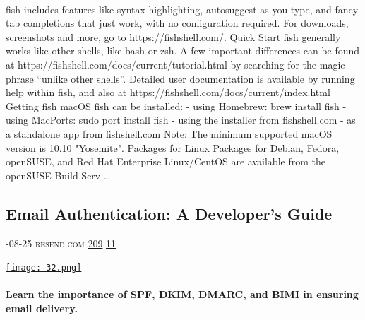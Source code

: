 \documentclass[10pt,a4paper]{article}
\begin{document}
\begin{multicols}{2}
\paragraph{}
 fish includes features like syntax highlighting, autosuggest-as-you-type, and fancy tab completions that just work, with no configuration required.
For downloads, screenshots and more, go to https://fishshell.com/.
Quick Start
fish generally works like other shells, like bash or zsh. A few important differences can be found at https://fishshell.com/docs/current/tutorial.html by searching for the magic phrase “unlike other shells”.
Detailed user documentation is available by running
help within
fish, and also at https://fishshell.com/docs/current/index.html
Getting fish
macOS
fish can be installed:
- using Homebrew:
brew install fish
- using MacPorts:
sudo port install fish
- using the installer from fishshell.com
- as a standalone app from fishshell.com
Note: The minimum supported macOS version is 10.10 "Yosemite".
Packages for Linux
Packages for Debian, Fedora, openSUSE, and Red Hat Enterprise Linux/CentOS are available from the openSUSE Build Serv
\dots\par
\noindent\begin{minipage}{\linewidth}
\medskip
\subsection{Email Authentication: A Developer's Guide}
\textsc{\footnotesize
{\scriptsize\faCalendar}-08-25 
{\scriptsize\faGlobe}\space 
resend.com 
{\scriptsize\faThumbsOUp}\space 
\href{http://news.ycombinator.com/item?id=37263708\&utm\_term=comment}{209} 
{\scriptsize\faComments}\space 
\href{http://news.ycombinator.com/item?id=37263708\&utm\_term=comment}{11} 
}
\par\medskip\noindent
\href{https://resend.com/blog/email-authentication-a-developers-guide?utm\_source=hackernewsletter\&utm\_medium=email\&utm\_term=code}{
    \texttt{[image: 32.png]}
}
\end{minipage}
\paragraph{}
\textbf{Learn the importance of SPF, DKIM, DMARC, and BIMI in ensuring email delivery.}
\paragraph{}


\end{multicols}
\end{document}
